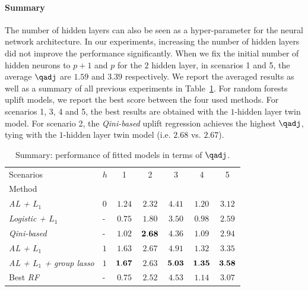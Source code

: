 \paragraph{Summary} The number of hidden layers can also be seen as a hyper-parameter for the neural network architecture. In our experiments, increasing the number of hidden layers did not improve the performance significantly. When we fix the initial number of hidden neurons to $p+1$ and $p$ for the $2$ hidden layer, in scenarios 1 and 5, the average $\qadj$ are $1.59$ and $3.39$ respectively.  We report the averaged results as well as a summary of all previous experiments in Table~\ref{tab:hidden_layers_results}. For random forests uplift models, we report the best score between the four used methods. For scenarios 1, 3, 4 and 5, the best results are obtained with the $1$-hidden layer twin model. For scenario 2, the {\it Qini-based} uplift regression achieves the highest $\qadj$, tying with the $1$-hidden layer twin model (i.e. $2.68$ vs. $2.67$).
{}
\begin{table}[H]
    \centering
    \caption{Summary: performance of fitted models in terms of $\qadj$.}
    \label{tab:hidden_layers_results}
    \begin{tabular}{l|l|ccccc}
        Scenarios &$h$ & 1 & 2 & 3 & 4 & 5\\
        Method &&&&&&\\
        \hline
        {\it AL + $L_1$} & $0$ & $1.24$  & $2.32$ & $4.41$ & $1.20$ & $3.12$\\
        {\it Logistic + $L_1$} & - & $0.75$ & $1.80$  & $3.50$ & $0.98$ & $2.59$\\
        {\it Qini-based} & - & $1.02$ & $\bf 2.68$ & $4.36$ & $1.09$ & $2.94$\\
        \hline
        {\it AL + $L_1$} & $1$ & $1.63$ & $2.67$  & $4.91$ & $1.32$ & $3.35$\\
        {\it AL + $L_1$ + \emph{group lasso}} & $1$ & $\bf 1.67$  & $2.63$ & $\bf5.03$ & $\bf1.35$ & $\bf3.58$\\
        Best {\it RF} & - & $0.75$ & $2.52$ & $4.53$ & $ 1.14$ & $3.07$\\
        \hline
    \end{tabular}
\end{table}
